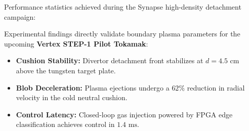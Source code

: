 \documentclass[landscape,a0,final]{a0poster}
\newlength{\colwidth}
\begin{document}
\begin{minipage}[t]{\colwidth}

  \begin{tcolorbox}[posterbox, title={\faCheckCircle\ 7. Quantitative Impact Metrics}]
    Performance statistics achieved during the Synapse high-density detachment campaign:

    \vspace{4pt}
  \end{tcolorbox}

  \begin{tcolorbox}[posterbox, title={\faCogs\ 8. Reactor Scaling \& STEP-1 Implications}]
    Experimental findings directly validate boundary plasma parameters for the upcoming \textbf{Vertex STEP-1 Pilot Tokamak}:

    \begin{itemize}[leftmargin=1.2em, itemsep=4pt]
      \item \textbf{Cushion Stability:} Divertor detachment front stabilizes at \(d = 4.5\text{ cm}\) above the tungsten target plate.
      \item \textbf{Blob Deceleration:} Plasma ejections undergo a \(62\%\) reduction in radial velocity in the cold neutral cushion.
      \item \textbf{Control Latency:} Closed-loop gas injection powered by FPGA edge classification achieves control in \(1.4\text{ ms}\).
    \end{itemize}
  \end{tcolorbox}


\end{minipage}
\end{document}
